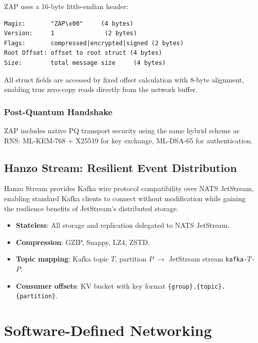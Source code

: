 \documentclass[11pt,letterpaper]{article}
\begin{document}
ZAP uses a 16-byte little-endian header:

\begin{lstlisting}[caption={ZAP wire header format.}]
Magic:       "ZAP\x00"     (4 bytes)
Version:     1              (2 bytes)
Flags:       compressed|encrypted|signed (2 bytes)
Root Offset: offset to root struct (4 bytes)
Size:        total message size     (4 bytes)
\end{lstlisting}

All struct fields are accessed by fixed offset calculation with 8-byte alignment, enabling true zero-copy reads directly from the network buffer.

\subsubsection{Post-Quantum Handshake}

ZAP includes native PQ transport security using the same hybrid scheme as RNS: ML-KEM-768 + X25519 for key exchange, ML-DSA-65 for authentication.

\subsection{Hanzo Stream: Resilient Event Distribution}

Hanzo Stream provides Kafka wire protocol compatibility over NATS JetStream, enabling standard Kafka clients to connect without modification while gaining the resilience benefits of JetStream's distributed storage.

\begin{itemize}
\item \textbf{Stateless}: All storage and replication delegated to NATS JetStream.
\item \textbf{Compression}: GZIP, Snappy, LZ4, ZSTD.
\item \textbf{Topic mapping}: Kafka topic $T$, partition $P$ $\to$ JetStream stream \texttt{kafka-$T$-$P$}.
\item \textbf{Consumer offsets}: KV bucket with key format \texttt{\{group\}.\{topic\}.\{partition\}}.
\end{itemize}

\section{Software-Defined Networking}
\end{document}
